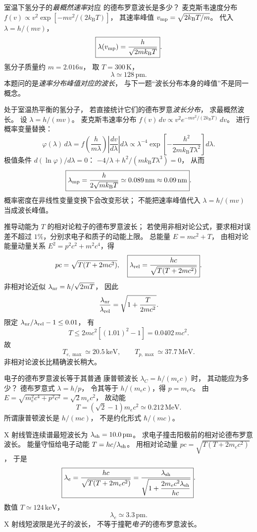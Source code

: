 室温下氢分子的\emph{最概然速率}对应
的德布罗意波长是多少？
\exsolution
麦克斯韦速度分布
$f(v)\propto v^2\exp[-mv^2/(2k_{\mathrm B}T)]$，
其速率峰值
$v_{\rm mp}=\sqrt{2k_{\mathrm B}T/m}$。
代入 $\lambda=h/(mv)$，
\[
 \boxed{\lambda(v_{\rm mp})=
 \frac{h}{\sqrt{2mk_{\mathrm B}T}}}.
\]
氢分子质量约 $m=2.016u$，
取 $T=300\,\mathrm K$，
\[
 \boxed{\lambda\simeq128\,\mathrm{pm}}.
\]
\excheck 本题问的是\emph{速率分布峰值对应的波长}，
与下一题“波长分布本身的峰值”不是同一概念。

处于室温热平衡的氢分子，
若直接统计它们的德布罗意\emph{波长分布}，
求最概然波长。
\exsolution
设 $\lambda=h/(mv)$。
麦克斯韦速率分布
$f(v)\,dv\propto
v^2e^{-mv^2/(2k_{\mathrm B}T)}\,dv$。
进行概率变量替换：
\[
 \varphi(\lambda)\,d\lambda
 =f\!\left(\frac h{m\lambda}\right)
 \left|\frac{dv}{d\lambda}\right|d\lambda
 \propto\lambda^{-4}
 \exp\!\left[-\frac{h^2}
 {2mk_{\mathrm B}T\lambda^2}\right]d\lambda.
\]
极值条件 $d(\ln\varphi)/d\lambda=0$：
$-4/\lambda+h^2/(mk_{\mathrm B}T\lambda^3)=0$，
从而
\[
 \boxed{\lambda_{\rm mp}=
 \frac h{2\sqrt{mk_{\mathrm B}T}}
 \simeq0.089\,\mathrm{nm}\approx0.09\,\mathrm{nm}}.
\]
\excheck 概率密度在非线性变量变换下会改变形状；
不能把速率峰值代入 $\lambda=h/(mv)$ 当成波长峰值。

推导动能为 $T$ 的相对论粒子的德布罗意波长；
若使用非相对论公式，要求相对误差不超过
$1\%$，分别求电子和质子的动能上限。
\exsolution
总能量 $E=mc^2+T$，
由相对论能量动量关系
$E^2=p^2c^2+m^2c^4$，得
\[
 pc=\sqrt{T(T+2mc^2)},\quad
 \boxed{\lambda_{\rm rel}=
 \frac{hc}{\sqrt{T(T+2mc^2)}}}.
\]
非相对论近似
$\lambda_{\rm nr}=h/\sqrt{2mT}$，
因此
\[
 \frac{\lambda_{\rm nr}}{\lambda_{\rm rel}}
 =\sqrt{1+\frac T{2mc^2}}.
\]
限定
$\lambda_{\rm nr}/\lambda_{\rm rel}-1\le0.01$，
有
\[
 \boxed{T\le2mc^2[(1.01)^2-1]
 =0.0402\,mc^2}.
\]
故
\[
 \boxed{T_{e,\max}\simeq20.5\,\mathrm{keV}},\qquad
 \boxed{T_{p,\max}\simeq37.7\,\mathrm{MeV}}.
\]
非相对论波长比精确波长稍大。

电子的德布罗意波长等于其普通
康普顿波长 $\lambda_C=h/(m_ec)$ 时，
其动能应为多少？
\exsolution
德布罗意式 $\lambda=h/p$，
令其等于 $h/(m_ec)$，得
$p=m_ec$。
由
$E=\sqrt{m_e^2c^4+p^2c^2}=\sqrt2m_ec^2$，
故动能
\[
 \boxed{T=(\sqrt2-1)m_ec^2
 \simeq0.212\,\mathrm{MeV}}.
\]
\excheck 所谓康普顿波长是 $h/(mc)$，
不是约化形式 $\hbar/(mc)$。

X 射线管连续谱最短波长为
$\lambda_{\rm sh}=10.0\,\mathrm{pm}$。
求电子撞击阳极前的相对论德布罗意波长。
\exsolution
能量守恒给电子动能
$T=hc/\lambda_{\rm sh}$。
用相对论动量
$pc=\sqrt{T(T+2m_ec^2)}$，
于是
\[
 \boxed{\lambda_e=
 \frac{hc}{\sqrt{T(T+2m_ec^2)}}
 =\frac{\lambda_{\rm sh}}
 {\sqrt{1+\dfrac{2m_ec^2\lambda_{\rm sh}}{hc}}}}.
\]
数值 $T\simeq124\,\mathrm{keV}$，
\[
 \boxed{\lambda_e\simeq3.3\,\mathrm{pm}}.
\]
\excheck X 射线短波限是光子的波长，
不等于撞靶\emph{电子}的德布罗意波长。

